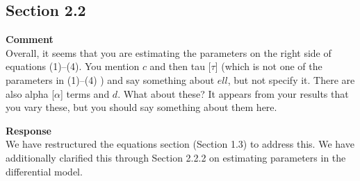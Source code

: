 \subsection{Section 2.2}

\textbf{Comment} \\
Overall, it seems that you are estimating the parameters on the right side of equations (1)--(4).
You mention $ c $ and then tau [$ \tau $] (which is not one of the parameters in (1)--(4) ) and say something about $ ell $, but not specify it.
There are also alpha [$ \alpha $] terms and $ d $.
What about these?
It appears from your results that you vary these, but you should say something about them here.

\textbf{Response} \\
We have restructured the equations section (Section 1.3) to address this.
We have additionally clarified this through Section 2.2.2 on estimating parameters in the differential model.
